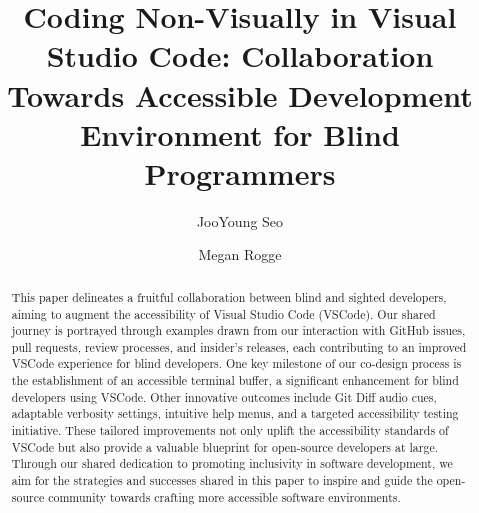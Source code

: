 \documentclass[sigconf]{acmart}
\begin{document}
\title[VSCode\_A11y]{Coding Non-Visually in Visual Studio Code:
Collaboration Towards Accessible Development Environment for Blind
Programmers}



  \author{JooYoung Seo}
        \author{Megan Rogge}
  
      
\renewcommand{\shortauthors}{Seo and Rogge}

\begin{abstract}
This paper delineates a fruitful collaboration between blind and sighted
developers, aiming to augment the accessibility of Visual Studio Code
(VSCode). Our shared journey is portrayed through examples drawn from
our interaction with GitHub issues, pull requests, review processes, and
insider's releases, each contributing to an improved VSCode experience
for blind developers. One key milestone of our co-design process is the
establishment of an accessible terminal buffer, a significant
enhancement for blind developers using VSCode. Other innovative outcomes
include Git Diff audio cues, adaptable verbosity settings, intuitive
help menus, and a targeted accessibility testing initiative. These
tailored improvements not only uplift the accessibility standards of
VSCode but also provide a valuable blueprint for open-source developers
at large. Through our shared dedication to promoting inclusivity in
software development, we aim for the strategies and successes shared in
this paper to inspire and guide the open-source community towards
crafting more accessible software environments.    
\end{abstract}
\end{document}
